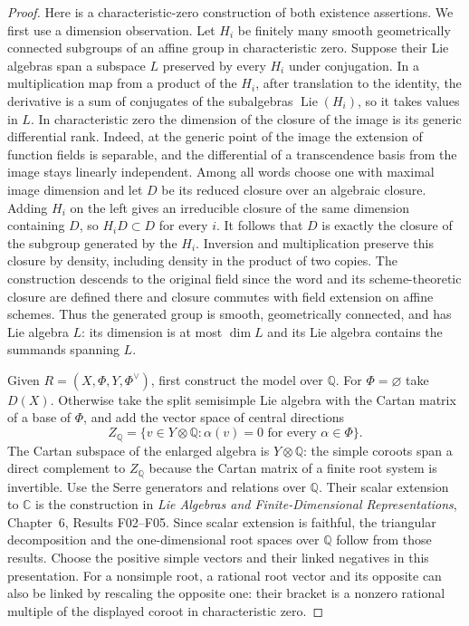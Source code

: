 \documentclass[11pt,a4paper,openany,oneside]{book}
\theoremstyle{resultstyle}
\theoremstyle{definition}
\numberwithin{equation}{chapter}
\DeclareMathOperator{\Lie}{Lie}
\newcommand{\QQ}{\mathbb{Q}}
\begin{document}
\begin{proof}
Here is a characteristic-zero construction of both existence
assertions. We first use a dimension observation. Let \(H_i\)
be finitely many smooth geometrically connected subgroups of an
affine group in characteristic zero. Suppose their Lie algebras
span a subspace \(L\) preserved by every \(H_i\) under conjugation.
In a multiplication map from a product of the \(H_i\), after
translation to the identity, the derivative is a sum of
conjugates of the subalgebras \(\Lie(H_i)\), so it takes values in
\(L\). In characteristic zero the dimension of the closure of
the image is its generic differential rank. Indeed, at the
generic point of the image the extension of function fields is
separable, and the differential of a transcendence basis from
the image stays linearly independent. Among all words choose
one with maximal image dimension and let \(D\) be its reduced
closure over an algebraic closure. Adding \(H_i\) on the left
gives an irreducible closure of the same dimension containing
\(D\), so \(H_iD\subset D\) for every \(i\). It follows that \(D\)
is exactly the closure of the subgroup generated by the \(H_i\).
Inversion and multiplication preserve this closure by density,
including density in the product of two copies. The construction
descends to the original field since the word and its
scheme-theoretic closure are defined there and closure
commutes with field extension on affine schemes. Thus the
generated group is smooth, geometrically connected, and has
Lie algebra \(L\): its dimension is at most \(\dim L\) and its
Lie algebra contains the summands spanning \(L\).

Given \(R=(X,\Phi,Y,\Phi^\vee)\), first construct the model
over \(\QQ\). For \(\Phi=\varnothing\) take \(D(X)\).
Otherwise take the split semisimple Lie algebra with the
Cartan matrix of a base of \(\Phi\), and add the vector
space of central directions
\[
 Z_{\QQ}=\{v\in Y\otimes\QQ:\alpha(v)=0\text{ for every }\alpha\in\Phi\}.
\]
The Cartan subspace of the enlarged algebra is \(Y\otimes\QQ\):
the simple coroots span a direct complement to \(Z_{\QQ}\)
because the Cartan matrix of a finite root system is
invertible. Use the Serre generators and relations over \(\QQ\).
Their scalar extension to \(\mathbb C\) is the construction
in \emph{Lie Algebras and Finite-Dimensional Representations},
Chapter~6, Results F02--F05. Since scalar extension is faithful,
the triangular decomposition and the one-dimensional root
spaces over \(\QQ\) follow from those results. Choose the
positive simple vectors and their linked negatives in this
presentation. For a nonsimple root, a rational root vector
and its opposite can also be linked by rescaling the opposite
one: their bracket is a nonzero rational multiple of the
displayed coroot in characteristic zero.


\end{proof}
\end{document}
